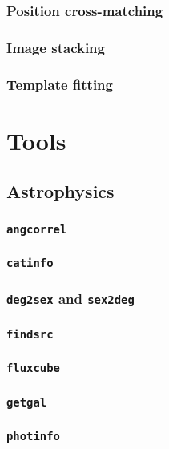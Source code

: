 \documentclass[12pt]{report}
\begin{document}
\subsection{Position cross-matching}

\subsection{Image stacking}

\subsection{Template fitting}

\chapter{Tools \label{SEC:tool}}

\section{Astrophysics \label{SEC:tool:astro}}
\subsection{\texttt{angcorrel}} 
\subsection{\texttt{catinfo}} 
\subsection{\texttt{deg2sex} and \texttt{sex2deg}}  
\subsection{\texttt{findsrc}} 
\subsection{\texttt{fluxcube}} 
\subsection{\texttt{getgal}} 
\subsection{\texttt{photinfo}} 
\end{document}
